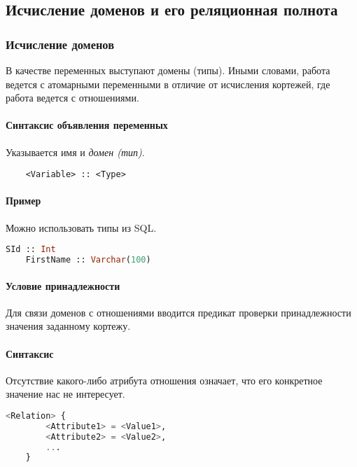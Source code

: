 \subsection{Исчисление доменов и его реляционная полнота}

\subsubsection{Исчисление доменов}

В качестве переменных выступают домены (типы). Иными словами, работа ведется с атомарными
переменными в отличие от исчисления кортежей, где работа ведется с отношениями.

\paragraph{Синтаксис объявления переменных}

Указывается имя и \textit{домен (тип)}.

\begin{lstlisting}
    <Variable> :: <Type>
\end{lstlisting}

\paragraph{Пример}

Можно использовать типы из SQL.

\begin{lstlisting}[language=SQL]
    SId :: Int
    FirstName :: Varchar(100)
\end{lstlisting}

\paragraph{Условие принадлежности}

Для связи доменов с отношениями вводится предикат проверки принадлежности значения заданному
кортежу.

\paragraph{Синтаксис}

Отсутствие какого-либо атрибута отношения означает, что его конкретное значение нас не интересует.

\begin{lstlisting}[language=SQL]
    <Relation> {
        <Attribute1> = <Value1>,
        <Attribute2> = <Value2>,
        ...
    }
\end{lstlisting}

